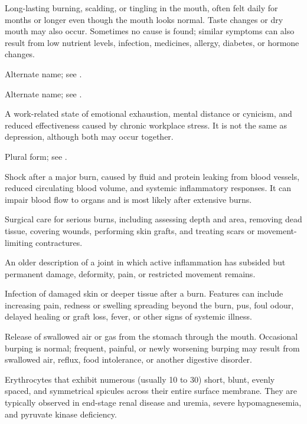  Long-lasting burning, scalding, or tingling in the mouth, often felt daily for months or longer even though the mouth looks normal. Taste changes or dry mouth may also occur. Sometimes no cause is found; similar symptoms can also result from low nutrient levels, infection, medicines, allergy, diabetes, or hormone changes.

 Alternate name; see .

 Alternate name; see .

 A work-related state of emotional exhaustion, mental distance or cynicism, and reduced effectiveness caused by chronic workplace stress. It is not the same as depression, although both may occur together.

 Plural form; see .

 Shock after a major burn, caused by fluid and protein leaking from blood vessels, reduced circulating blood volume, and systemic inflammatory responses. It can impair blood flow to organs and is most likely after extensive burns.

 Surgical care for serious burns, including assessing depth and area, removing dead tissue, covering wounds, performing skin grafts, and treating scars or movement-limiting contractures.

 An older description of a joint in which active inflammation has subsided but permanent damage, deformity, pain, or restricted movement remains.

 Infection of damaged skin or deeper tissue
after a burn. Features can include increasing pain, redness or swelling
spreading beyond the burn, pus, foul odour, delayed healing or graft loss,
fever, or other signs of systemic illness.

 Release of swallowed air or gas from the stomach through the mouth. Occasional burping is normal; frequent, painful, or newly worsening burping may result from swallowed air, reflux, food intolerance, or another digestive disorder.

 Erythrocytes that exhibit numerous (usually 10 to 30) short, blunt, evenly spaced, and symmetrical spicules across their entire surface membrane. They are typically observed in end-stage renal disease and uremia, severe hypomagnesemia, and pyruvate kinase deficiency.

